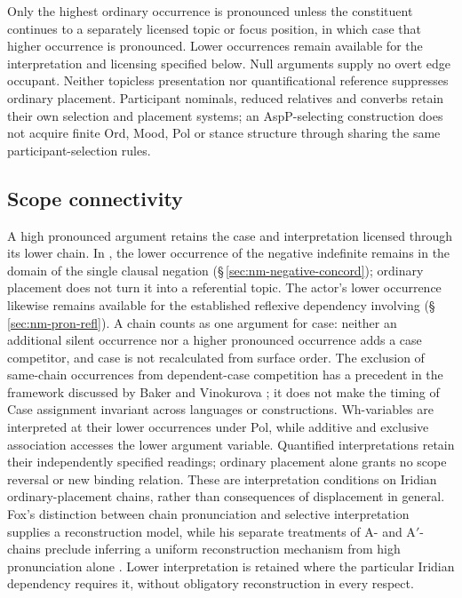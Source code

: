 Only the highest ordinary occurrence is pronounced unless the constituent
 continues to a separately licensed topic or focus position, in which case
 that higher occurrence is pronounced. Lower occurrences remain available
 for the interpretation and licensing specified below. Null arguments supply
 no overt edge occupant. Neither topicless presentation nor quantificational
 reference suppresses ordinary placement. Participant nominals, reduced
 relatives and converbs retain their own selection and placement systems;
 an AspP-selecting construction does not acquire finite Ord, Mood, Pol or
 stance structure through sharing the same participant-selection rules.

\subsection{Scope connectivity}
\label{sec:pivot-scope-connectivity}

A high pronounced argument retains the case and interpretation licensed
 through its lower chain. In , the lower occurrence of
 the negative indefinite remains in the domain of the single clausal negation
 (§\,\ref{sec:nm-negative-concord}); ordinary placement does not turn it into
 a referential topic. The actor's lower occurrence likewise remains available
 for the established reflexive dependency involving 
 (§\,\ref{sec:nm-pron-refl}). A chain counts as one argument for case:
 neither an additional silent occurrence nor a higher pronounced occurrence
 adds a case competitor, and case is not recalculated from surface order.
 The exclusion of same-chain occurrences from dependent-case competition has
 a precedent in the framework discussed by Baker and Vinokurova
 \cite[§1]{bakervinokurova2010}; it does not make the timing of Case assignment
 invariant across languages or constructions.
 Wh-variables are interpreted at their lower occurrences under Pol, while
 additive and exclusive association accesses the lower argument variable.
 Quantified interpretations retain their independently specified readings;
 ordinary placement alone grants no scope reversal or new binding relation.
 These are interpretation conditions on Iridian ordinary-placement chains,
 rather than consequences of displacement in general. Fox's distinction
 between chain pronunciation and selective interpretation supplies a
 reconstruction model, while his separate treatments of A- and A$'$-chains
 preclude inferring a uniform reconstruction mechanism from high pronunciation
 alone \cite[pp.~157--159, 192--193]{fox1999}. Lower interpretation is retained
 where the particular Iridian dependency requires it, without obligatory
 reconstruction in every respect.

